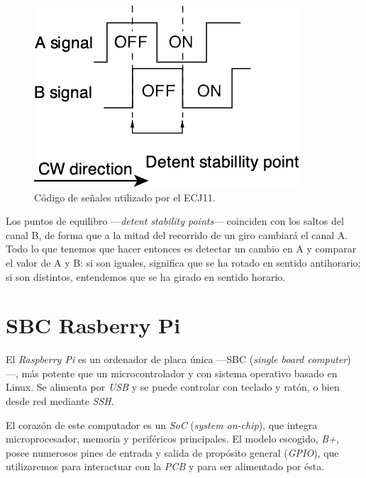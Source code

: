 \begin{figure}[H]
	\noindent \begin{centering}
		\includegraphics[width=\linewidth/2]{capitulo3/rotary}
		\par\end{centering}
	\smallskip
	\caption{\label{fig:rotary} Código de señales utilizado por el ECJ11.}
\end{figure} 

\smallskip

Los puntos de equilibro ---\textit{detent stability points}--- coinciden con los saltos del canal B, de forma que a la mitad del recorrido de un giro cambiará el canal A. Todo lo que tenemos que hacer entonces es detectar un cambio en A y comparar el valor de A y B: si son iguales, significa que se ha rotado en sentido antihorario; si son distintos, entendemos que se ha girado en sentido horario.

\section{SBC Rasberry Pi}

El \textit{Raspberry Pi} es un ordenador de placa única ---SBC (\textit{single board computer})---, más potente que un microcontrolador y con sistema operativo basado en Linux. Se alimenta por \textit{USB} y se puede controlar con teclado y ratón, o bien desde red mediante \textit{SSH}. 

El corazón de este computador es un \textit{SoC} (\textit{system on-chip}), que integra microprocesador, memoria y periféricos principales. El modelo escogido, \textit{B+}, posee numerosos pines de entrada y salida de propósito general (\textit{GPIO}), que utilizaremos para interactuar con la \textit{PCB} y para ser alimentado por ésta.


